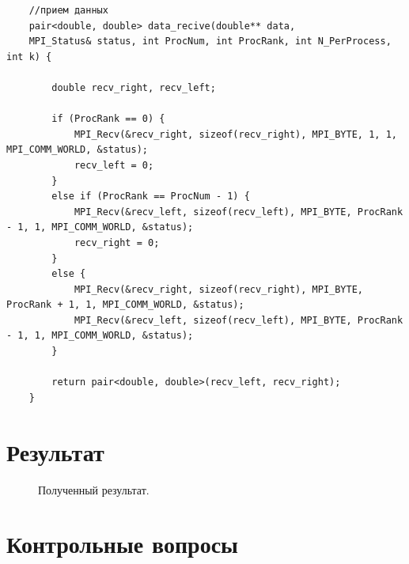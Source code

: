 \documentclass[a4paper]{article}
\begin{document}
{\begin{verbatim}
	//прием данных
	pair<double, double> data_recive(double** data, 
	MPI_Status& status, int ProcNum, int ProcRank, int N_PerProcess, int k) {
		
		double recv_right, recv_left;
	
		if (ProcRank == 0) {
			MPI_Recv(&recv_right, sizeof(recv_right), MPI_BYTE, 1, 1, MPI_COMM_WORLD, &status);
			recv_left = 0;
		}
		else if (ProcRank == ProcNum - 1) {
			MPI_Recv(&recv_left, sizeof(recv_left), MPI_BYTE, ProcRank - 1, 1, MPI_COMM_WORLD, &status);
			recv_right = 0;
		}
		else {
			MPI_Recv(&recv_right, sizeof(recv_right), MPI_BYTE, ProcRank + 1, 1, MPI_COMM_WORLD, &status);
			MPI_Recv(&recv_left, sizeof(recv_left), MPI_BYTE, ProcRank - 1, 1, MPI_COMM_WORLD, &status);
		}
	
		return pair<double, double>(recv_left, recv_right);
	}

\end{verbatim}
}

\section{Результат}
\begin{figure}[h]
	\caption{Полученный результат.}
	\end{figure}

\section{Контрольные вопросы}
\end{document}
